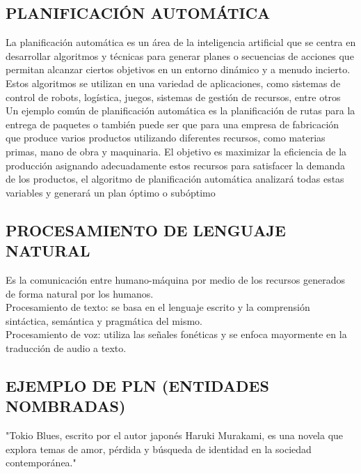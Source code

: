 \subsection{PLANIFICACIÓN AUTOMÁTICA}

La planificación automática es un área de la inteligencia artificial que se centra en desarrollar algoritmos 
y técnicas para generar planes o secuencias de acciones que permitan alcanzar ciertos objetivos en un entorno 
dinámico y a menudo incierto. Estos algoritmos se utilizan en una variedad de aplicaciones, como sistemas 
de control de robots, logística, juegos, sistemas de gestión de recursos, entre otros\\


Un ejemplo común de planificación automática es la planificación de rutas para la entrega de paquetes o también 
puede ser que para una empresa de fabricación que produce varios productos utilizando diferentes recursos, como 
materias primas, mano de obra y maquinaria. El objetivo es maximizar la eficiencia de la producción asignando 
adecuadamente estos recursos para satisfacer la demanda de los productos, el algoritmo de planificación 
automática analizará todas estas variables y generará un plan óptimo o subóptimo


\subsection{PROCESAMIENTO DE LENGUAJE NATURAL}

Es la comunicación entre humano-máquina por medio de los recursos generados de forma natural por los humanos.\\

Procesamiento de texto: se basa en el lenguaje escrito y la comprensión sintáctica, semántica y pragmática del mismo.\\

Procesamiento de voz: utiliza las señales fonéticas y se enfoca mayormente en la traducción de audio a texto.\\

\subsection{EJEMPLO DE PLN (ENTIDADES NOMBRADAS)}

"Tokio Blues, escrito por el autor japonés Haruki Murakami, es una novela que explora temas de amor, 
pérdida y búsqueda de identidad en la sociedad contemporánea."\\

